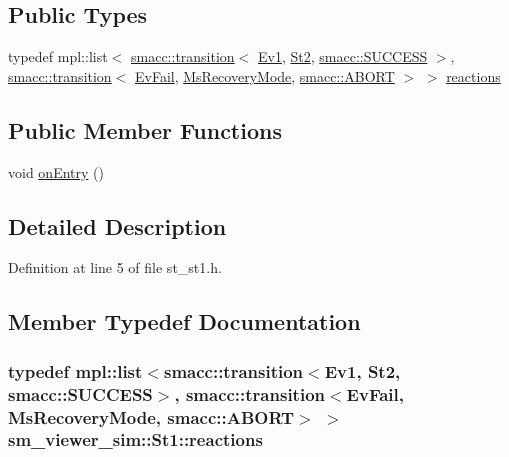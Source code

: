 \subsection*{Public Types}
\begin{DoxyCompactItemize}
\item 
typedef mpl\+::list$<$ \hyperlink{classsmacc_1_1transition}{smacc\+::transition}$<$ \hyperlink{structsm__viewer__sim_1_1Ev1}{Ev1}, \hyperlink{structsm__viewer__sim_1_1St2}{St2}, \hyperlink{structsmacc_1_1SUCCESS}{smacc\+::\+S\+U\+C\+C\+E\+SS} $>$, \hyperlink{classsmacc_1_1transition}{smacc\+::transition}$<$ \hyperlink{structsm__viewer__sim_1_1EvFail}{Ev\+Fail}, \hyperlink{structsm__viewer__sim_1_1MsRecoveryMode}{Ms\+Recovery\+Mode}, \hyperlink{structsmacc_1_1ABORT}{smacc\+::\+A\+B\+O\+RT} $>$ $>$ \hyperlink{structsm__viewer__sim_1_1St1_ae0680705534c7e8eb95c959ed6763532}{reactions}
\end{DoxyCompactItemize}
\subsection*{Public Member Functions}
\begin{DoxyCompactItemize}
\item 
void \hyperlink{structsm__viewer__sim_1_1St1_ab4651cd52d9db7f7e8a4496d8214bfbe}{on\+Entry} ()
\end{DoxyCompactItemize}


\subsection{Detailed Description}


Definition at line 5 of file st\+\_\+st1.\+h.



\subsection{Member Typedef Documentation}
\subsubsection[{\texorpdfstring{reactions}{reactions}}]{\setlength{\rightskip}{0pt plus 5cm}typedef mpl\+::list$<${\bf smacc\+::transition}$<${\bf Ev1}, {\bf St2}, {\bf smacc\+::\+S\+U\+C\+C\+E\+SS}$>$, {\bf smacc\+::transition}$<${\bf Ev\+Fail}, {\bf Ms\+Recovery\+Mode}, {\bf smacc\+::\+A\+B\+O\+RT}$>$ $>$ {\bf sm\+\_\+viewer\+\_\+sim\+::\+St1\+::reactions}}\hypertarget{structsm__viewer__sim_1_1St1_ae0680705534c7e8eb95c959ed6763532}{}\label{structsm__viewer__sim_1_1St1_ae0680705534c7e8eb95c959ed6763532}


